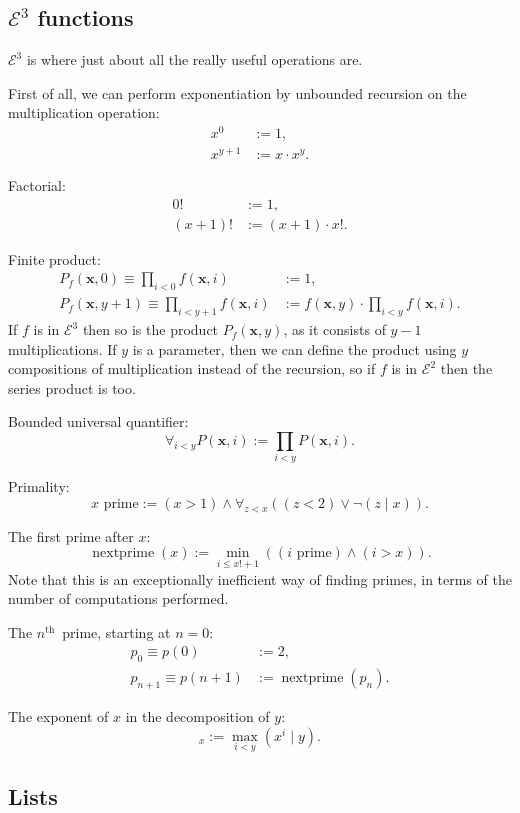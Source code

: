 \documentclass[a4paper]{article}
\newcommand{\grz}[1]{$\mathcal{E}^{#1}$}	%
\newcommand{\nth}{$n^{\textrm{th}}$~}	%
\newcommand{\xvec}{\mathbf{x}}	%
\newcommand{\recur}[1]{\begin{equation} \begin{split} #1 \end{split} \end{equation}}	%
\theoremstyle{plain}
\theoremstyle{definition}
\begin{document}
\subsection{\grz{3} functions}
\grz{3} is where just about all the really useful operations are.

First of all, we can perform exponentiation by unbounded recursion on the multiplication operation:
\recur{
	x^0 &:= 1,				\\
	x^{y+1} &:= x \cdot x^y.
}

Factorial:
\recur{
	0! &:= 1,	\\
	(x+1)! &:= (x+1) \cdot x!.
}

Finite product:
\recur{
	P_f(\xvec,0) \equiv \prod_{i < 0} f(\xvec,i) &:= 1,	\\
	P_f(\xvec,y+1) \equiv \prod_{i < y+1} f(\xvec,i) &:= f(\xvec,y) \cdot \prod_{i < y} f(\xvec, i).
}
If $f$ is in \grz{3} then so is the product $P_f(\xvec,y)$, as it consists of $y-1$ multiplications. If $y$ is a parameter, then we can define the product using $y$ compositions of multiplication instead of the recursion, so if $f$ is in \grz{2} then the series product is too.

Bounded universal quantifier:
\begin{equation} \forall_{i < y} P(\xvec,i) := \prod_{i < y} P(\xvec,i). \end{equation}

Primality:
\begin{equation} x \textrm{ prime} :=  (x > 1) \wedge \forall_{z < x} \left( (z < 2) \vee \neg (z \mid x) \right). \end{equation}

The first prime after $x$:
\begin{equation} \operatorname{nextprime}(x) := \min_{i \leq x!+1} \left( (i \textrm{ prime}) \wedge (i > x) \right). \end{equation}
Note that this is an exceptionally inefficient way of finding primes, in terms of the number of computations performed. 

The \nth prime, starting at $n=0$:
\recur{
	p_0 \equiv p(0) &:= 2,		\\
	p_{n+1} \equiv p(n+1) &:= \operatorname{nextprime} (p_n).
}

The exponent of $x$ in the decomposition of $y$:
\begin{equation} [y]_x := \max_{i < y} \left( x^i \mid y \right). \end{equation}

\subsection{Lists}\label{sec:lists}
\end{document}
